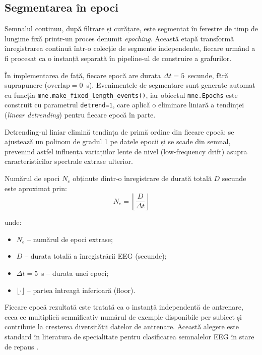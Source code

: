 \documentclass[12pt,a4paper]{report}
\theoremstyle{definition}
\theoremstyle{remark}
\begin{document}
\subsection{Segmentarea în epoci}

Semnalul continuu, după filtrare și curățare, este segmentat în ferestre de timp de lungime fixă printr-un proces denumit \textit{epoching}. Această etapă transformă înregistrarea continuă într-o colecție de segmente independente, fiecare urmând a fi procesat ca o instanță separată în pipeline-ul de construire a grafurilor.

În implementarea de față, fiecare epocă are durata $\Delta t = 5$~secunde, fără suprapunere ($\text{overlap} = 0$~s). Evenimentele de segmentare sunt generate automat cu funcția \texttt{mne.make\_fixed\_length\_events()}, iar obiectul \texttt{mne.Epochs} este construit cu parametrul \texttt{detrend=1}, care aplică o eliminare liniară a tendinței (\textit{linear detrending}) pentru fiecare epocă în parte.

Detrending-ul liniar elimină tendința de primă ordine din fiecare epocă: se ajustează un polinom de gradul 1 pe datele epocii și se scade din semnal, prevenind astfel influența variațiilor lente de nivel (low-frequency drift) asupra caracteristicilor spectrale extrase ulterior.

Numărul de epoci $N_e$ obținute dintr-o înregistrare de durată totală $D$ secunde este aproximat prin:
\begin{equation}
    N_e = \left\lfloor \frac{D}{\Delta t} \right\rfloor
    \label{eq:num_epochs}
\end{equation}

\noindent unde:
\begin{itemize}
    \item $N_e$ -- numărul de epoci extrase;
    \item $D$ -- durata totală a înregistrării EEG (secunde);
    \item $\Delta t = 5$~s -- durata unei epoci;
    \item $\lfloor \cdot \rfloor$ -- partea întreagă inferioară (floor).
\end{itemize}

Fiecare epocă rezultată este tratată ca o instanță independentă de antrenare, ceea ce multiplică semnificativ numărul de exemple disponibile per subiect și contribuie la creșterea diversității datelor de antrenare. Această alegere este standard în literatura de specialitate pentru clasificarea semnalelor EEG în stare de repaus \cite{klepl2023gnn,awais2024graphical}.
\end{document}
